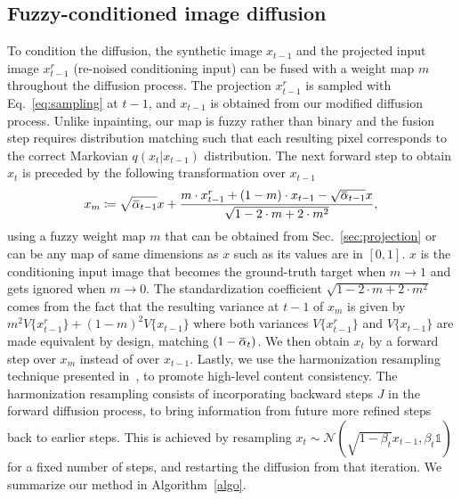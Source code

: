 \documentclass{article}
\newcommand{\overbar}[1]{\mkern 1.5mu\overline{\mkern-1.5mu#1\mkern-1.5mu}\mkern 1.5mu}
\begin{document}
\subsection{Fuzzy-conditioned image diffusion} \label{sec:fuzzy}
To condition the diffusion, the synthetic image $x_{t-1}$ and the projected input image $x^r_{t-1}$ (re-noised conditioning input) can be fused with a weight map $m$ throughout the diffusion process. The projection $x^r_{t-1}$ is sampled with Eq.~\eqref{eq:sampling} at $t-1$, and $x_{t-1}$ is obtained from our modified diffusion process. Unlike inpainting, our map is fuzzy rather than binary and the fusion step requires distribution matching such that each resulting pixel corresponds to the correct Markovian $q(x_t|x_{t-1})$ distribution. 
The next forward step to obtain $x_t$ is preceded by the following transformation over $x_{t-1}$
\begin{equation}
    x_m \coloneqq \sqrt{\overbar{\alpha}_{t-1}} x
    + \frac{
    m \cdot x^r_{t-1} + (1-m)\cdot x_{t-1} - \sqrt{\overbar{\alpha}_{t-1}} x
    }{
    \sqrt{1-2\cdot m + 2\cdot m^2}
    },
\end{equation}
using a fuzzy weight map $m$ that can be obtained from Sec.~\ref{sec:projection} or can be any map of same dimensions as $x$ such as its values are in $[0,1]$. $x$ is the conditioning input image that becomes the ground-truth target when $m\to 1$ and gets ignored when $m\to 0$. The standardization coefficient $\sqrt{1-2\cdot m + 2\cdot m^2}$ comes from the fact that the resulting variance at $t-1$  of $x_m$ is given by $m^2 V\{x^r_{t-1}\} + (1-m)^2 V\{x_{t-1}\}$ where both variances $V\{x^r_{t-1}\}$ and $V\{x_{t-1}\}$ are made equivalent by design, matching $(1-\overbar{\alpha}_t)$. We then obtain $x_t$ by a forward step over $x_m$ instead of over $x_{t-1}$. Lastly, we use the harmonization resampling technique presented in~\cite{lugmayr2022repaint}, to promote high-level content consistency. The harmonization resampling consists of incorporating backward steps $J$ in the forward diffusion process, to bring information from future more refined steps back to earlier steps. This is achieved by resampling $x_t \sim \mathcal{N}(\sqrt{1-\beta_t} x_{t-1}, \beta_t \mathbb{1})$ for a fixed number of steps, and restarting the diffusion from that iteration. We summarize our method in Algorithm~\ref{algo}.
\end{document}
